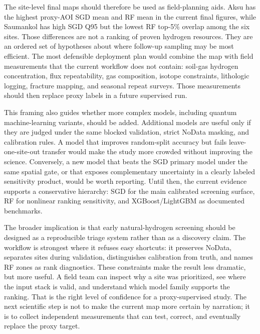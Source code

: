 \documentclass[numrefs]{interact}
\theoremstyle{plain}%
\theoremstyle{definition}
\theoremstyle{remark}
\begin{document}
The site-level final maps should therefore be used as field-planning aids. Aksu has the highest proxy-AOI SGD mean and RF mean in the current final figures, while Saumankol has high SGD Q95 but the lowest RF top-5\% overlap among the six sites. Those differences are not a ranking of proven hydrogen resources. They are an ordered set of hypotheses about where follow-up sampling may be most efficient. The most defensible deployment plan would combine the map with field measurements that the current workflow does not contain: soil-gas hydrogen concentration, flux repeatability, gas composition, isotope constraints, lithologic logging, fracture mapping, and seasonal repeat surveys. Those measurements should then replace proxy labels in a future supervised run.

This framing also guides whether more complex models, including quantum machine-learning variants, should be added. Additional models are useful only if they are judged under the same blocked validation, strict NoData masking, and calibration rules. A model that improves random-split accuracy but fails leave-one-site-out transfer would make the study more crowded without improving the science. Conversely, a new model that beats the SGD primary model under the same spatial gate, or that exposes complementary uncertainty in a clearly labeled sensitivity product, would be worth reporting. Until then, the current evidence supports a conservative hierarchy: SGD for the main calibrated screening surface, RF for nonlinear ranking sensitivity, and XGBoost/LightGBM as documented benchmarks.

The broader implication is that early natural-hydrogen screening should be designed as a reproducible triage system rather than as a discovery claim. The workflow is strongest where it refuses easy shortcuts: it preserves NoData, separates sites during validation, distinguishes calibration from truth, and names RF zones as rank diagnostics. These constraints make the result less dramatic, but more useful. A field team can inspect why a site was prioritized, see where the input stack is valid, and understand which model family supports the ranking. That is the right level of confidence for a proxy-supervised study. The next scientific step is not to make the current map more certain by narration; it is to collect independent measurements that can test, correct, and eventually replace the proxy target.
\end{document}
